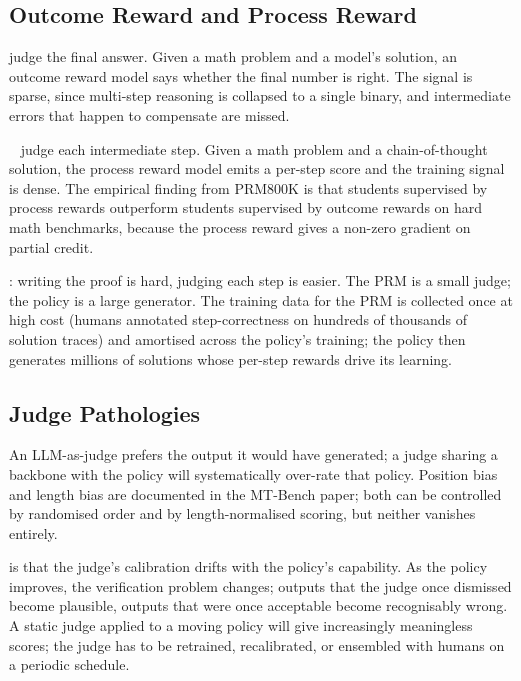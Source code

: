 \subsection{Outcome Reward and Process Reward}

 judge the final answer. Given a math problem and a model's solution, an outcome reward model says whether the final number is right. The signal is sparse, since multi-step reasoning is collapsed to a single binary, and intermediate errors that happen to compensate are missed.

~\cite{Lightman2024PRM} judge each intermediate step. Given a math problem and a chain-of-thought solution, the process reward model emits a per-step score and the training signal is dense. The empirical finding from PRM800K is that students supervised by process rewards outperform students supervised by outcome rewards on hard math benchmarks, because the process reward gives a non-zero gradient on partial credit.

: writing the proof is hard, judging each step is easier. The PRM is a small judge; the policy is a large generator. The training data for the PRM is collected once at high cost (humans annotated step-correctness on hundreds of thousands of solution traces) and amortised across the policy's training; the policy then generates millions of solutions whose per-step rewards drive its learning.

\subsection{Judge Pathologies}


 An LLM-as-judge prefers the output it would have generated; a judge sharing a backbone with the policy will systematically over-rate that policy. Position bias and length bias are documented in the MT-Bench paper; both can be controlled by randomised order and by length-normalised scoring, but neither vanishes entirely.

 is that the judge's calibration drifts with the policy's capability. As the policy improves, the verification problem changes; outputs that the judge once dismissed become plausible, outputs that were once acceptable become recognisably wrong. A static judge applied to a moving policy will give increasingly meaningless scores; the judge has to be retrained, recalibrated, or ensembled with humans on a periodic schedule.

